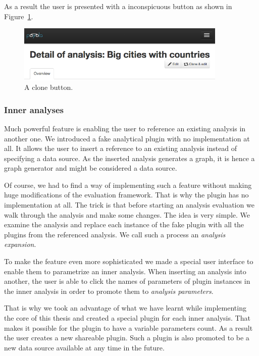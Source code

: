 As a result the user is presented with a inconspicuous button as shown in 
Figure~\ref{fig:clone-button}.

\begin{figure}
	\centering
	\includegraphics[width=100mm]{img/clone-button.png}
	\caption{A clone button.}
	\label{fig:clone-button}
\end{figure}

\subsubsection{Inner analyses}
Much powerful feature is enabling the user to reference an existing analysis in 
another one. We introduced a fake analytical plugin with no implementation at 
all. It allows the user to insert a reference to an existing analysis instead 
of specifying a data source. As the inserted analysis generates a graph, 
it is hence a graph generator and might be considered a data source.

Of course, we had to find a way of implementing such a feature without 
making huge modifications of the evaluation framework. That is why the plugin 
has no implementation at all. The trick is that before starting an analysis 
evaluation we walk through the analysis and make some changes. The idea is very 
simple. We examine the analysis and replace each instance of the fake plugin 
with all the plugins from the referenced analysis. We call such a process an 
\emph{analysis expansion}.

To make the feature even more sophisticated we made a special user interface to 
enable them to parametrize an inner analysis. When inserting an analysis into 
another, the user is able to click the names of parameters of plugin instances 
in the inner analysis in order to promote them to \emph{analysis parameters}.

That is why we took an advantage of what we have learnt while implementing the 
core of this thesis and created a special plugin for each inner analysis. That 
makes it possible for the plugin to have a variable parameters count. As a result the 
user creates a new shareable plugin. Such a plugin is also promoted to be a new 
data source available at any time in the future.


